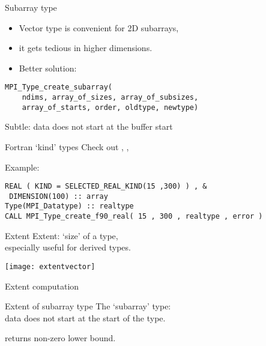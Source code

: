 \begin{numberedframe}{Subarray type}
  \begin{itemize}
  \item Vector type is convenient for 2D subarrays,
  \item it gets tedious in higher dimensions.
  \item Better solution: 
  \end{itemize}
\begin{lstlisting}
MPI_Type_create_subarray(
    ndims, array_of_sizes, array_of_subsizes,
    array_of_starts, order, oldtype, newtype)  
\end{lstlisting}
Subtle: data does not start at the buffer start
\end{numberedframe}

\begin{exerciseframe}[cubegather]
  
\end{exerciseframe}

\begin{fortran}
\begin{numberedframe}{Fortran `kind' types}
  Check out
,
,

Example:
\lstset{language=Fortran}
\begin{lstlisting}
REAL ( KIND = SELECTED_REAL_KIND(15 ,300) ) , &
 DIMENSION(100) :: array
Type(MPI_Datatype) :: realtype
CALL MPI_Type_create_f90_real( 15 , 300 , realtype , error )
\end{lstlisting}
\end{numberedframe}
\end{fortran}


\begin{numberedframe}{Extent}
  Extent: `size' of a type,\\
  especially useful for derived types.

  \texttt{[image: extentvector]}
\end{numberedframe}

\begin{numberedframe}{Extent computation}
\end{numberedframe}

\begin{numberedframe}{Extent of subarray type}
  The `subarray' type: \\
  data does not start at the start of the type.

   returns
  non-zero lower bound.
\end{numberedframe}

